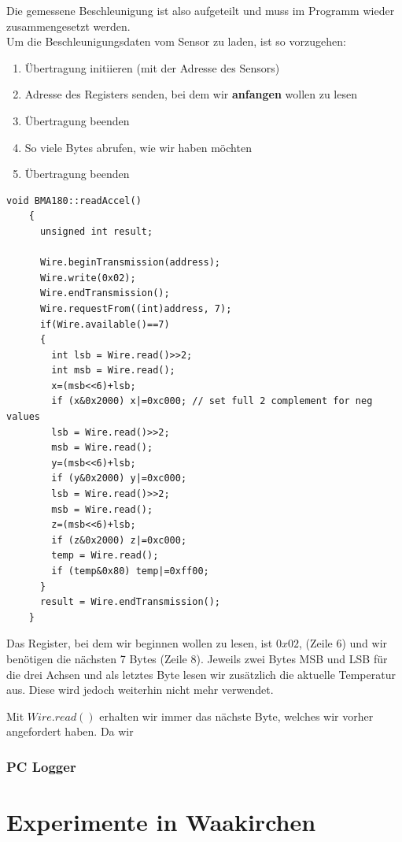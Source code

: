 \documentclass[12pt,a4paper]{scrartcl}
\begin{document}
Die gemessene Beschleunigung ist also aufgeteilt und muss im Programm wieder zusammengesetzt werden. \\

Um die Beschleunigungsdaten vom Sensor zu laden, ist so vorzugehen:
\begin{enumerate}
	\item Übertragung initiieren (mit der Adresse des Sensors)
	\item Adresse des Registers senden, bei dem wir \textbf{anfangen} wollen zu lesen
	\item Übertragung beenden
	\item So viele Bytes abrufen, wie wir haben möchten
	\item Übertragung beenden
\end{enumerate}

\begin{lstlisting}[frame=trBL]
	void BMA180::readAccel()
	{
	  unsigned int result;

	  Wire.beginTransmission(address);
	  Wire.write(0x02);
	  Wire.endTransmission();
	  Wire.requestFrom((int)address, 7);
	  if(Wire.available()==7)
	  {
	    int lsb = Wire.read()>>2;
	    int msb = Wire.read();
	    x=(msb<<6)+lsb; 
	    if (x&0x2000) x|=0xc000; // set full 2 complement for neg values
	    lsb = Wire.read()>>2;
	    msb = Wire.read();
	    y=(msb<<6)+lsb;
	    if (y&0x2000) y|=0xc000;
	    lsb = Wire.read()>>2;
	    msb = Wire.read();
	    z=(msb<<6)+lsb;
	    if (z&0x2000) z|=0xc000;
	    temp = Wire.read();
	    if (temp&0x80) temp|=0xff00;
	  }
	  result = Wire.endTransmission();
	}
\end{lstlisting}

Das Register, bei dem wir beginnen wollen zu lesen, ist $0x02$, (Zeile 6) und wir benötigen die nächsten 7 Bytes (Zeile 8). Jeweils zwei Bytes MSB und LSB für die drei Achsen und als letztes Byte lesen wir zusätzlich die aktuelle Temperatur aus. Diese wird jedoch weiterhin nicht mehr verwendet.

Mit $Wire.read()$ erhalten wir immer das nächste Byte, welches wir vorher angefordert haben. Da wir 


\subsubsection{PC Logger}



\section{Experimente in Waakirchen}
\end{document}
